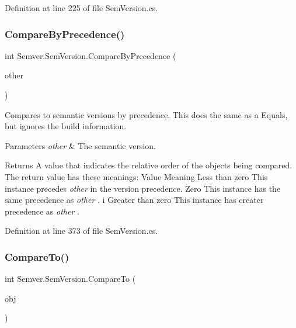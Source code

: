 Definition at line 225 of file Sem\+Version.\+cs.

\mbox{\label{class_semver_1_1_sem_version_adabe1c3ea77ec1dae140cdc3aa4c60b1}} 
\subsubsection{\texorpdfstring{CompareByPrecedence()}{CompareByPrecedence()}}
{\footnotesize\ttfamily int Semver.\+Sem\+Version.\+Compare\+By\+Precedence (\begin{DoxyParamCaption}\item[{\mbox{\hyperlink{class_semver_1_1_sem_version}{Sem\+Version}}}]{other }\end{DoxyParamCaption})}



Compares to semantic versions by precedence. This does the same as a Equals, but ignores the build information. 


\begin{DoxyParams}{Parameters}
{\em other} & The semantic version.\\
\hline
\end{DoxyParams}
\begin{DoxyReturn}{Returns}
A value that indicates the relative order of the objects being compared. The return value has these meanings\+: Value Meaning Less than zero This instance precedes {\itshape other}  in the version precedence. Zero This instance has the same precedence as {\itshape other} . i Greater than zero This instance has creater precedence as {\itshape other} . 
\end{DoxyReturn}


Definition at line 373 of file Sem\+Version.\+cs.

\mbox{\label{class_semver_1_1_sem_version_aef2d58904fc4226c0f4688de353e8204}} 
\subsubsection{\texorpdfstring{CompareTo()}{CompareTo()}\hspace{0.1cm}{\footnotesize\ttfamily [1/2]}}
{\footnotesize\ttfamily int Semver.\+Sem\+Version.\+Compare\+To (\begin{DoxyParamCaption}\item[{object}]{obj }\end{DoxyParamCaption})}



